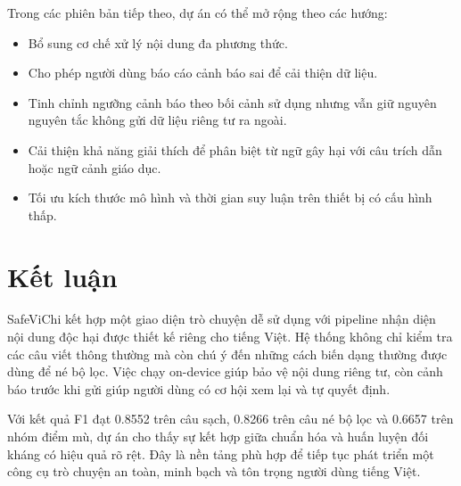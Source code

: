 \documentclass[12pt,a4paper]{article}
\begin{document}
Trong các phiên bản tiếp theo, dự án có thể mở rộng theo các hướng:
\begin{itemize}
    \item Bổ sung cơ chế xử lý nội dung đa phương thức.
    \item Cho phép người dùng báo cáo cảnh báo sai để cải thiện dữ liệu.
    \item Tinh chỉnh ngưỡng cảnh báo theo bối cảnh sử dụng nhưng vẫn giữ nguyên nguyên tắc không gửi dữ liệu riêng tư ra ngoài.
    \item Cải thiện khả năng giải thích để phân biệt từ ngữ gây hại với câu trích dẫn hoặc ngữ cảnh giáo dục.
    \item Tối ưu kích thước mô hình và thời gian suy luận trên thiết bị có cấu hình thấp.
\end{itemize}

\section{Kết luận}

SafeViChi kết hợp một giao diện trò chuyện dễ sử dụng với pipeline nhận diện nội dung độc hại được thiết kế riêng cho tiếng Việt. Hệ thống không chỉ kiểm tra các câu viết thông thường mà còn chú ý đến những cách biến dạng thường được dùng để né bộ lọc. Việc chạy on-device giúp bảo vệ nội dung riêng tư, còn cảnh báo trước khi gửi giúp người dùng có cơ hội xem lại và tự quyết định.

Với kết quả F1 đạt 0.8552 trên câu sạch, 0.8266 trên câu né bộ lọc và 0.6657 trên nhóm điểm mù, dự án cho thấy sự kết hợp giữa chuẩn hóa và huấn luyện đối kháng có hiệu quả rõ rệt. Đây là nền tảng phù hợp để tiếp tục phát triển một công cụ trò chuyện an toàn, minh bạch và tôn trọng người dùng tiếng Việt.
\end{document}
